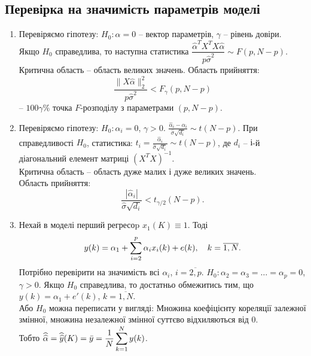 \subsection{Перевірка на значимість параметрів моделі}

\begin{enumerate}
	\item Перевіряємо гіпотезу: $H_0:\alpha=0$ -- вектор параметрів, $\gamma$ -- рівень довіри. \\

	Якщо $H_0$ справедлива, то наступна статистика $\dfrac{\widehat{\alpha}^TX^TX\widehat{\alpha}}{p\widehat{\sigma}^2} \sim F(p, N-p)$. \\

	Критична область -- область великих значень. Область прийняття: \[ \dfrac{\|X\widehat{\alpha}\|_2^2}{p\widehat{\sigma}^2} < F_\gamma(p,N-p)\] -- $100\gamma\%$ точка $F$-розподілу з параметрами $(p,N-p)$.

	\item Перевіряємо гіпотезу: $H_0: \alpha_i = 0$, $\gamma>0$. $\frac{\widehat{\alpha}_i-\alpha_i}{\widehat{\sigma}\sqrt{d_i}} \sim t(N-p)$. При справедливості $H_0$, статистика: $t_i = \frac{\widehat{\alpha}_i}{\widehat{\sigma}\sqrt{d_i}} \sim t(N-p)$, де $d_i$ -- $і$-й діагональний елемент матриці $(X^TX)^{-1}$. \\

	Критична область -- область дуже малих і дуже великих значень. \\

	Область прийняття: \[\dfrac{|\widehat{\alpha}_i|}{\widehat{\sigma}\sqrt{d_i}} < t_{\gamma/2}(N-p).\]

	\item Нехай в моделі перший регресоp $x_1(K) \equiv 1$. Тоді \[y(k) = \alpha_1 + \displaystyle\sum\limits_{i=2}^p \alpha_i x_i(k) + e(k), \quad k = \overline{1,N}.\] Потрібно перевірити на значимість всі $\alpha_i$, $i=\overline{2,p}$. $H_0: \alpha_2 = \alpha_3 = \ldots = \alpha_p = 0$, $\gamma > 0$. Якщо $H_0$ справедлива, то достатньо обмежитись тим, що $y(k)= \alpha_1 + e'(k)$, $k = \overline{1,N}$. \\

	Або $H_0$ можна переписати у вигляді: Множина коефіцієнту кореляції залежної змінної, множина незалежної змінної суттєво відхиляються від 0. \\

	Тобто $\widehat{\widehat{\alpha}} = \widehat{\widehat{y}}(K) = \bar{y} = \dfrac{1}{N} \displaystyle\sum\limits_{k=1}^N y(k)$.


\end{enumerate}
